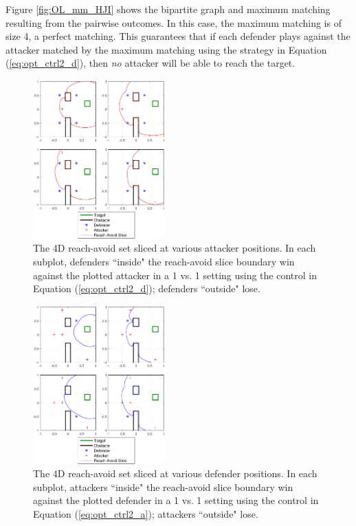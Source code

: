 Figure \ref{fig:OL_mm_HJI} shows the bipartite graph and maximum matching resulting from the pairwise outcomes. In this case, the maximum matching is of size 4, a perfect matching. This guarantees that if each defender plays against the attacker matched by the maximum matching using the strategy in Equation (\ref{eq:opt_ctrl2_d}), then \textit{no} attacker will be able to reach the target.

\begin{figure}
	\centering
	\includegraphics[width=0.45\textwidth]{"fig/OLGame_pw_results_HJI_fixA"}
	\caption{The 4D reach-avoid set sliced at various attacker positions. In each subplot, defenders ``inside" the reach-avoid slice boundary win against the plotted attacker in a 1 vs. 1 setting using the control in Equation (\ref{eq:opt_ctrl2_d}); defenders ``outside" lose.}
	\label{fig:OL_pw_HJIA}
\end{figure}

\begin{figure}
	\centering
	\includegraphics[width=0.45\textwidth]{"fig/OLGame_pw_results_HJI_fixD"}
	\caption{The 4D reach-avoid set sliced at various defender positions. In each subplot, attackers ``inside" the reach-avoid slice boundary win against the plotted defender in a 1 vs. 1 setting using the control in Equation (\ref{eq:opt_ctrl2_a}); attackers ``outside" lose.}
	\label{fig:OL_pw_HJID}
\end{figure}

